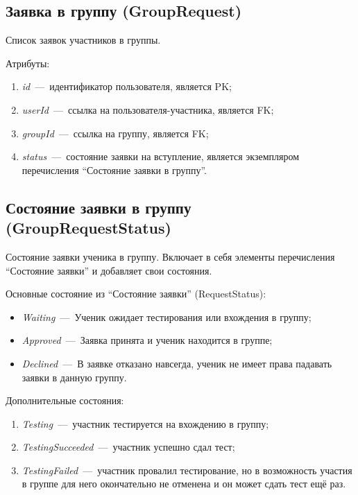 \documentclass[14pt]{article}
\begin{document}
\subsection{Заявка в группу (GroupRequest)}

Список заявок участников в группы.

Атрибуты:
\begin{enumerate}
	\item \emph{id}~---~идентификатор пользователя, является PK; 
	\item \emph{userId}~---~ссылка на пользователя-участника, является FK;
	\item \emph{groupId}~---~ссылка на группу, является FK;
	\item \emph{status}~---~состояние заявки на вступление, является экземпляром перечисления ``Состояние заявки в группу''.
\end{enumerate}


\subsection{Состояние заявки в группу (GroupRequestStatus)}

Состояние заявки ученика в группу. Включает в себя элементы перечисления ``Состояние заявки'' и добавляет свои состояния.

Основные состояние из ``Состояние заявки'' (RequestStatus):

\begin{itemize}
	\item \emph{Waiting}~---~Ученик ожидает тестирования или вхождения в группу;
	\item \emph{Approved}~---~Заявка принята и ученик находится в группе;
	\item \emph{Declined}~---~В заявке отказано навсегда, ученик не имеет права падавать заявки в данную группу.
\end{itemize}

Дополнительные состояния:
\begin{enumerate}
	\item \emph{Testing}~---~участник тестируется на вхождению в группу;
	\item \emph{TestingSucceeded}~---~участник успешно сдал тест;
	\item \emph{TestingFailed}~---~участник провалил тестирование, но в возможность участия в группе для него окончательно не отменена и он может сдать тест ещё раз.
\end{enumerate}
\end{document}
